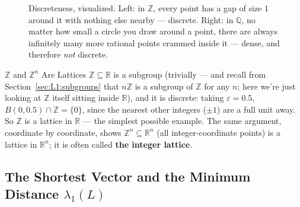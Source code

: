 \begin{figure}[h]
\centering
{}
\caption{Discreteness, visualized. Left: in $\mathbb{Z}$, every point has a gap of size $1$ around it with nothing else nearby --- discrete. Right: in $\mathbb{Q}$, no matter how small a circle you draw around a point, there are always infinitely many more rational points crammed inside it --- dense, and therefore \emph{not} discrete.}
\label{fig:discrete}
\end{figure}

\begin{exbox}{$\mathbb{Z}$ and $\mathbb{Z}^n$ Are Lattices}
$\mathbb{Z} \subseteq \mathbb{R}$ is a subgroup (trivially --- and recall from Section~\ref{sec:L1:subgroups} that $n\mathbb{Z}$ is a subgroup of $\mathbb{Z}$ for any $n$; here we're just looking at $\mathbb{Z}$ itself sitting inside $\mathbb{R}$), and it is discrete: taking $\varepsilon = 0.5$, $B(0, 0.5) \cap \mathbb{Z} = \{0\}$, since the nearest other integers ($\pm 1$) are a full unit away. So $\mathbb{Z}$ is a lattice in $\mathbb{R}$ --- the simplest possible example. The same argument, coordinate by coordinate, shows $\mathbb{Z}^n \subseteq \mathbb{R}^n$ (all integer-coordinate points) is a lattice in $\mathbb{R}^n$; it is often called \textbf{the integer lattice}.
\end{exbox}

\subsection{The Shortest Vector and the Minimum Distance $\lambda_1(L)$}
\label{sec:L1:the-shortest-vector-and-the-minimum-dist}

